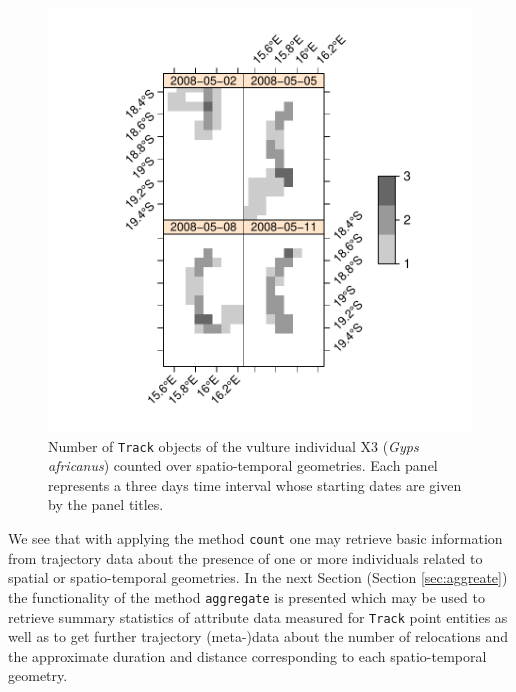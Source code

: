 \documentclass[12pt, oneside, a4paper]{scrbook}
\let\code=\texttt
\begin{document}
\begin{figure}[!htb]
\centering
\includegraphics{trajagg-count_stf_vulture_X3_fig_1}
\caption[Number of \code{Track} objects of a vulture counted over spatio-temporal geometries.]{Number of \code{Track} objects of the vulture individual X3 (\textit{Gyps africanus}) counted over spatio-temporal geometries. Each panel represents a three days time interval whose starting dates are given by the panel titles.}
\label{fig:counttracksx3overstf}
\end{figure}


We see that with applying the method \code{count} one may retrieve basic information from trajectory data about the presence of one or more individuals related to spatial or spatio-temporal geometries. In the next Section (Section \ref{sec:aggreate}) the functionality of the method \code{aggregate} is presented which may be used to retrieve summary statistics of attribute data measured for \code{Track} point entities as well as to get further trajectory (meta-)data about the number of relocations and the approximate duration and distance corresponding to each spatio-temporal geometry.



\end{document}
